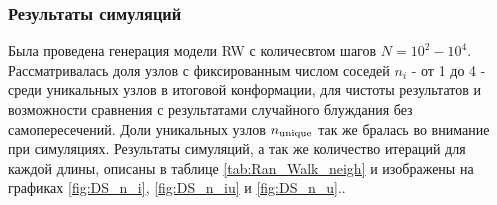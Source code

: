 \subsubsection{Результаты симуляций}

Была проведена генерация модели RW с количесвтом шагов $N = 10^{2}-10^{4}$. 
Рассматривалась доля узлов с фиксированным числом соседей $n_i$ - от 1 до 4 - среди уникальных узлов в итоговой конформации, для чистоты результатов и возможности сравнения с результатами случайного блуждания без самопересечений.
Доли уникальных узлов $n_{\textup{unique}}$ так же бралась во внимание при симуляциях. 
Результаты симуляций, а так же количество итераций для каждой длины, описаны в таблице \ref{tab:Ran_Walk_neigh} и изображены на графиках \ref{fig:DS_n_i}, \ref{fig:DS_n_iu} и \ref{fig:DS_n_u}.\footnotemark{}.


